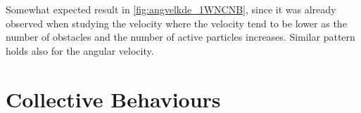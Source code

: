 Somewhat expected result in \cref{fig:angvelkde_1WNCNB}, since it was already observed when 
studying the velocity where the velocity tend to be lower as the number of obstacles and the 
number of active particles increases. Similar pattern holds also for the angular velocity.






\newpage
\section{Collective Behaviours} \label{collective_behaviors}

